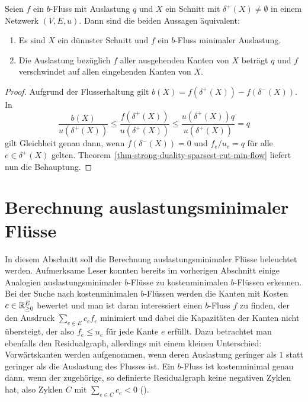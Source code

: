 \begin{corollary}\label{cor-easy-characterization-sparsest-cut}
	Seien $f$ ein $b$-Fluss mit Auslastung $q$ und $X$ ein Schnitt mit $\delta^+(X)\neq \emptyset$ in einem Netzwerk $(V, E, u)$.
	Dann sind die beiden Aussagen äquivalent:
	\begin{enumerate}[label=(\roman*)]
		\item Es sind $X$ ein dünnster Schnitt und $f$ ein $b$-Fluss minimaler Auslastung.
		\item Die Auslastung bezüglich $f$ aller ausgehenden Kanten von $X$ beträgt $q$ und $f$ verschwindet auf allen eingehenden Kanten von $X$.
	\end{enumerate}
\end{corollary}
\begin{proof}
	Aufgrund der Flusserhaltung gilt $b(X) = f(\delta^+(X)) - f(\delta^-(X))$.
	In \[
	\frac{b(X)}{u(\delta^+(X))} \leq \frac{f(\delta^+(X))}{u(\delta^+(X))} \leq \frac{u(\delta^+(X)) q}{u(\delta^+(X))} = q
	\]
	gilt Gleichheit genau dann, wenn $f(\delta^-(X))=0$ und $f_{e}/u_{e} = q$ für alle $e\in\delta^+(X)$ gelten.
	Theorem~\ref{thm-strong-duality-sparsest-cut-min-flow} liefert nun die Behauptung.
\end{proof}


\section{Berechnung auslastungsminimaler Flüsse}

In diesem Abschnitt soll die Berechnung auslastungsminimaler Flüsse beleuchtet werden.
Aufmerksame Leser konnten bereits im vorherigen Abschnitt einige Analogien auslastungsminimaler $b$-Flüsse zu kostenminimalen $b$-Flüssen erkennen.
Bei der Suche nach kostenminimalen $b$-Flüssen werden die Kanten mit Kosten $c\in\mathbb{R}_{\geq 0}^E$ bewertet und man ist daran interessiert einen $b$-Fluss $f$ zu finden, der den Ausdruck $\sum_{e \in E} c_e f_e$ minimiert und dabei die Kapazitäten der Kanten nicht übersteigt, der also $f_e \leq u_e$ für jede Kante $e$ erfüllt.
Dazu betrachtet man ebenfalls den Residualgraph, allerdings mit einem kleinen Unterschied: Vorwärtskanten werden aufgenommen, wenn deren Auslastung geringer als $1$ statt geringer als die Auslastung des Flusses ist.
Ein $b$-Fluss ist kostenminimal genau dann, wenn der zugehörige, so definierte Residualgraph keine negativen Zyklen hat, also Zyklen $C$ mit $\sum_{e\in C} c_e < 0$ ().

